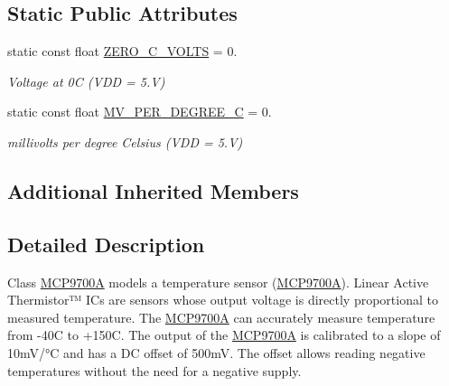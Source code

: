 \subsection*{Static Public Attributes}
\begin{DoxyCompactItemize}
\item 
\hypertarget{classsmrtobj_1_1io_1_1_m_c_p9700_a_a4c94b0a799b0ebe161faed70b6dcc9b7}{}static const float \hyperlink{classsmrtobj_1_1io_1_1_m_c_p9700_a_a4c94b0a799b0ebe161faed70b6dcc9b7}{Z\+E\+R\+O\+\_\+\+C\+\_\+\+V\+O\+L\+T\+S} = 0.\label{classsmrtobj_1_1io_1_1_m_c_p9700_a_a4c94b0a799b0ebe161faed70b6dcc9b7}

\begin{DoxyCompactList}\small\item\em Voltage at 0\+C (V\+D\+D = 5.\+V) \end{DoxyCompactList}\item 
\hypertarget{classsmrtobj_1_1io_1_1_m_c_p9700_a_aaff6eec065bd28948e4eafc5792c51a3}{}static const float \hyperlink{classsmrtobj_1_1io_1_1_m_c_p9700_a_aaff6eec065bd28948e4eafc5792c51a3}{M\+V\+\_\+\+P\+E\+R\+\_\+\+D\+E\+G\+R\+E\+E\+\_\+\+C} = 0.\label{classsmrtobj_1_1io_1_1_m_c_p9700_a_aaff6eec065bd28948e4eafc5792c51a3}

\begin{DoxyCompactList}\small\item\em millivolts per degree Celsius (V\+D\+D = 5.\+V) \end{DoxyCompactList}\end{DoxyCompactItemize}
\subsection*{Additional Inherited Members}


\subsection{Detailed Description}
Class \hyperlink{classsmrtobj_1_1io_1_1_m_c_p9700_a}{M\+C\+P9700\+A} models a temperature sensor (\hyperlink{classsmrtobj_1_1io_1_1_m_c_p9700_a}{M\+C\+P9700\+A}). Linear Active Thermistor™ I\+Cs are sensors whose output voltage is directly proportional to measured temperature. The \hyperlink{classsmrtobj_1_1io_1_1_m_c_p9700_a}{M\+C\+P9700\+A} can accurately measure temperature from -\/40\+C to +150\+C. The output of the \hyperlink{classsmrtobj_1_1io_1_1_m_c_p9700_a}{M\+C\+P9700\+A} is calibrated to a slope of 10m\+V/°\+C and has a D\+C offset of 500m\+V. The offset allows reading negative temperatures without the need for a negative supply. 

